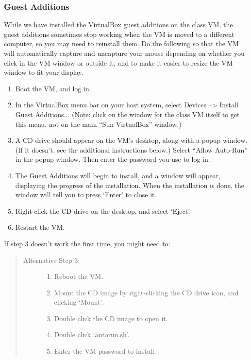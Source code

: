 \documentclass[letterpaper,10pt,english]{sphinxmanual}
\begin{document}
\subsubsection{Guest Additions}
\label{2013/vm:guest-additions}\label{2013/vm:vm-additions}
While we have installed the VirtualBox guest additions on the class
VM, the guest additions sometimes stop working when the VM is moved to
a different computer, so you may need to reinstall them.
Do the following so that the VM will automatically capture and uncapture
your mouse depending on whether you click in the VM window or outside it,
and to make it easier to resize the VM window to fit your display.
\begin{enumerate}
\item {} 
Boot the VM, and log in.

\item {} 
In the VirtualBox menu bar on your host system, select Devices --\textgreater{}
Install Guest Additions...  (Note: click on the window for the class
VM itself to get this menu, not on the main ``Sun VirtualBox'' window.)

\item {} 
A CD drive should appear on the VM's desktop, along with a popup
window.  (If it doesn't, see the additional instructions below.)
Select ``Allow Auto-Run'' in the popup window.  Then enter the
password you use to log in.

\item {} 
The Guest Additions will begin to install, and a window will appear,
displaying the progress of the installation.  When the installation is done,
the window will tell you to press `Enter' to close it.

\item {} 
Right-click the CD drive on the desktop, and select `Eject'.

\item {} 
Restart the VM.

\end{enumerate}

If step 3 doesn't work the first time, you might need to:
\begin{quote}
\begin{description}
\item[{Alternative Step 3:}] \leavevmode\begin{enumerate}
\item {} 
Reboot the VM.

\item {} 
Mount the CD image by right-clicking the CD drive icon, and clicking
`Mount'.

\item {} 
Double click the CD image to open it.

\item {} 
Double click `autorun.sh'.

\item {} 
Enter the VM password to install.

\end{enumerate}

\end{description}
\end{quote}
\end{document}
